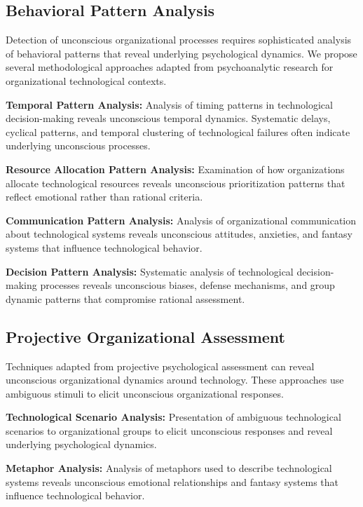 \documentclass[10pt, twocolumn]{article}
\begin{document}
\subsection{Behavioral Pattern Analysis}

Detection of unconscious organizational processes requires sophisticated analysis of behavioral patterns that reveal underlying psychological dynamics. We propose several methodological approaches adapted from psychoanalytic research for organizational technological contexts.

\textbf{Temporal Pattern Analysis:} Analysis of timing patterns in technological decision-making reveals unconscious temporal dynamics. Systematic delays, cyclical patterns, and temporal clustering of technological failures often indicate underlying unconscious processes.

\textbf{Resource Allocation Pattern Analysis:} Examination of how organizations allocate technological resources reveals unconscious prioritization patterns that reflect emotional rather than rational criteria.

\textbf{Communication Pattern Analysis:} Analysis of organizational communication about technological systems reveals unconscious attitudes, anxieties, and fantasy systems that influence technological behavior.

\textbf{Decision Pattern Analysis:} Systematic analysis of technological decision-making processes reveals unconscious biases, defense mechanisms, and group dynamic patterns that compromise rational assessment.

\subsection{Projective Organizational Assessment}

Techniques adapted from projective psychological assessment can reveal unconscious organizational dynamics around technology. These approaches use ambiguous stimuli to elicit unconscious organizational responses.

\textbf{Technological Scenario Analysis:} Presentation of ambiguous technological scenarios to organizational groups to elicit unconscious responses and reveal underlying psychological dynamics.

\textbf{Metaphor Analysis:} Analysis of metaphors used to describe technological systems reveals unconscious emotional relationships and fantasy systems that influence technological behavior.
\end{document}
